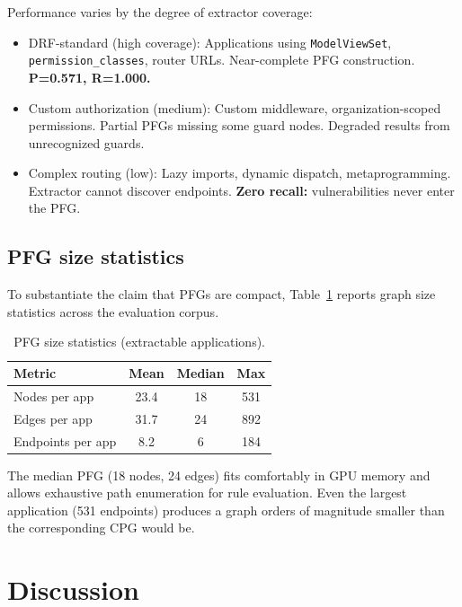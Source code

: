 Performance varies by the degree of extractor coverage:
\begin{itemize}
    \item{DRF-standard (high coverage):} Applications using
    \texttt{ModelViewSet}, \texttt{permission\_classes}, router URLs.
    Near-complete PFG construction. \textbf{P=0.571, R=1.000.}
    \item{Custom authorization (medium):} Custom middleware,
    organization-scoped permissions. Partial PFGs missing some guard nodes.
    Degraded results from unrecognized guards.
    \item{Complex routing (low):} Lazy imports, dynamic dispatch,
    metaprogramming. Extractor cannot discover endpoints.
    \textbf{Zero recall:} vulnerabilities never enter the PFG.
\end{itemize}

\subsection{PFG size statistics}
\label{sec:det-sizes}

To substantiate the claim that PFGs are compact, Table~\ref{tab:det-sizes}
reports graph size statistics across the evaluation corpus.

\begin{table}[htbp]
\centering
\caption{PFG size statistics (extractable applications).}
\label{tab:det-sizes}
\small
\begin{tabular}{@{}lccc@{}}
\toprule
\textbf{Metric} & \textbf{Mean} & \textbf{Median} & \textbf{Max} \\
\midrule
Nodes per app & 23.4 & 18 & 531 \\
Edges per app & 31.7 & 24 & 892 \\
Endpoints per app & 8.2 & 6 & 184 \\
\bottomrule
\end{tabular}
\end{table}

The median PFG (18 nodes, 24 edges) fits comfortably in GPU memory and
allows exhaustive path enumeration for rule evaluation. Even the largest
application (531 endpoints) produces a graph orders of magnitude smaller than
the corresponding CPG would be.


\section{Discussion}
\label{det:discussion}

